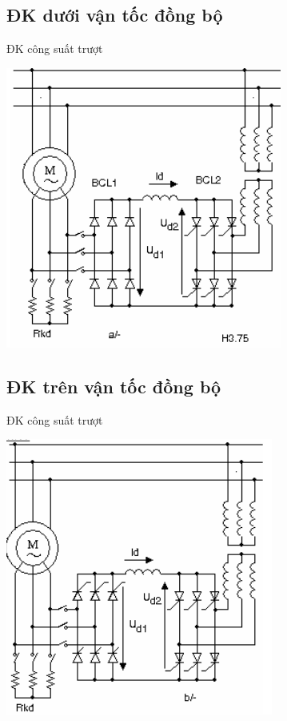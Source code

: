 \documentclass[24pt]{beamer}
\begin{document}
\subsection*{ĐK dưới vận tốc đồng bộ}
\begin{frame}{ĐK công suất trượt}
		\begin{center}
			\includegraphics[scale=.5]{images-chude3/cascade-2.png} 
		\end{center}
\end{frame}

\subsection*{ĐK trên vận tốc đồng bộ}
\begin{frame}{ĐK công suất trượt}
		\begin{center}
			\includegraphics[scale=.5]{images-chude3/cascade.png} 
		\end{center}
\end{frame}
\end{document}
